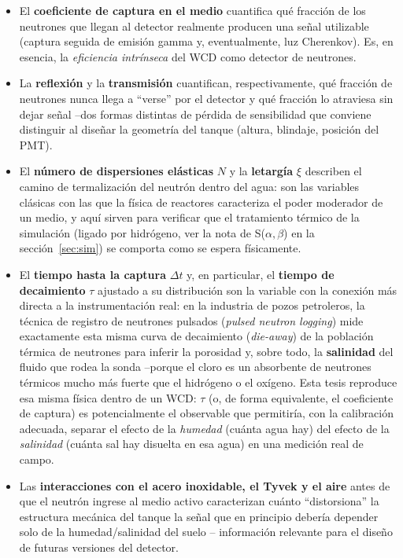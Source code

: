 \documentclass[11pt,a4paper]{article}
\begin{document}
\begin{itemize}
  \item El \textbf{coeficiente de captura en el medio} cuantifica qué fracción de los neutrones que
  llegan al detector realmente producen una señal utilizable (captura seguida de emisión gamma y,
  eventualmente, luz Cherenkov). Es, en esencia, la \emph{eficiencia intrínseca} del WCD como
  detector de neutrones.
  \item La \textbf{reflexión} y la \textbf{transmisión} cuantifican, respectivamente, qué fracción
  de neutrones nunca llega a ``verse'' por el detector y qué fracción lo atraviesa sin dejar señal
  --dos formas distintas de pérdida de sensibilidad que conviene distinguir al diseñar la geometría
  del tanque (altura, blindaje, posición del PMT).
  \item El \textbf{número de dispersiones elásticas} $N$ y la \textbf{letargía} $\xi$ describen el
  camino de termalización del neutrón dentro del agua: son las variables clásicas con las que la
  física de reactores caracteriza el poder moderador de un medio, y aquí sirven para verificar que
  el tratamiento térmico de la simulación (ligado por hidrógeno, ver la nota de S($\alpha,\beta$) en
  la sección~\ref{sec:sim}) se comporta como se espera físicamente.
  \item El \textbf{tiempo hasta la captura} $\Delta t$ y, en particular, el \textbf{tiempo de
  decaimiento} $\tau$ ajustado a su distribución son la variable con la conexión más directa a la
  instrumentación real: en la industria de pozos petroleros, la técnica de registro de neutrones
  pulsados (\textit{pulsed neutron logging}) mide exactamente esta misma curva de decaimiento
  (\textit{die-away}) de la población térmica de neutrones para inferir la porosidad y, sobre todo,
  la \textbf{salinidad} del fluido que rodea la sonda --porque el cloro es un absorbente de
  neutrones térmicos mucho más fuerte que el hidrógeno o el oxígeno. Esta tesis reproduce esa misma
  física dentro de un WCD: $\tau$ (o, de forma equivalente, el coeficiente de captura) es
  potencialmente el observable que permitiría, con la calibración adecuada, separar el efecto de la
  \emph{humedad} (cuánta agua hay) del efecto de la \emph{salinidad} (cuánta sal hay disuelta en esa
  agua) en una medición real de campo.
  \item Las \textbf{interacciones con el acero inoxidable, el Tyvek y el aire} antes de que el
  neutrón ingrese al medio activo caracterizan cuánto ``distorsiona'' la estructura mecánica del
  tanque la señal que en principio debería depender solo de la humedad/salinidad del suelo --
  información relevante para el diseño de futuras versiones del detector.
\end{itemize}
\end{document}
